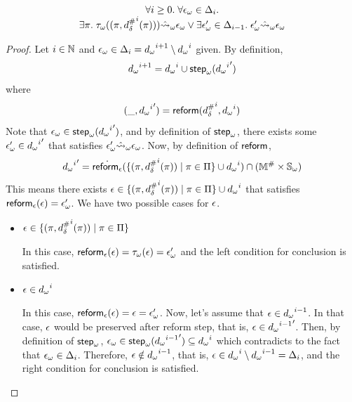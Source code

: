 \begin{lemma}\label{lemma:diffset_prop}
  \[
    \begin{array}{c}
      \forall i \geq 0. \; \forall {\epsilon}_\omega \in \Delta_i. \\
      \exists \pi. \; {\tau}_\omega((\pi,{{d}^{\#}_\delta}^i(\pi))) \hat{\leadsto}_\omega {\epsilon}_\omega 
      \lor \exists {\epsilon}_\omega' \in \Delta_{i-1} . \; {\epsilon}_\omega' \hat{\leadsto}_\omega {\epsilon}_\omega
    \end{array}
  \]
\end{lemma}
\begin{proof}
  Let $i \in \mathbb{N}$ and ${\epsilon}_\omega \in \Delta_i = {{d}_\omega}^{i+1} \setminus {{d}_\omega}^i$ given.
  By definition,
  \[
    {{d}_\omega}^{i+1} = {{d}_\omega}^i \cup {\textsf{step}}_\omega({{{d}_\omega}^i}')
  \]
  where
  \[
    (\_, {{{d}_\omega}^i}') = \textsf{reform}({{d}^{\#}_\delta}^i, {{d}_\omega}^i)
  \]
  Note that ${\epsilon}_\omega \in {\textsf{step}}_\omega({{{d}_\omega}^i}')$,
  and by definition of ${\textsf{step}}_\omega$, there exists some
  ${\epsilon}_\omega' \in {{{d}_\omega}^i}'$ that satisfies ${\epsilon}_\omega' \hat{\leadsto}_\omega {\epsilon}_\omega$.
  Now, by definition of $\textsf{reform}$,
  \[
    {{{d}_\omega}^i}' =
    \dot{\textsf{reform}_\epsilon}(\{ (\pi, {{d}^{\#}_\delta}^i(\pi)) \mid \pi \in \Pi \} \cup {{d}_\omega}^i)
    \cap ({\mathbb{M}}^{\#} \times {\mathbb{S}}_\omega)
  \]
  This means there exists
  $\epsilon \in \{ (\pi, {{d}^{\#}_\delta}^i(\pi)) \mid \pi \in \Pi \} \cup {{d}_\omega}^i$
  that satisfies $\textsf{reform}_\epsilon(\epsilon) = {\epsilon}_\omega'$. We have two possible cases for $\epsilon$.
  \begin{itemize}
 
  \item $\epsilon \in \{ (\pi, {{d}^{\#}_\delta}^i(\pi)) \mid \pi \in \Pi \}$

  In this case, $\textsf{reform}_\epsilon(\epsilon) = {\tau}_\omega(\epsilon) = {\epsilon}_\omega'$
  and the left condition for conclusion is satisfied.
  
  \item $\epsilon \in {{d}_\omega}^i$

  In this case, $\textsf{reform}_\epsilon(\epsilon) = \epsilon = {\epsilon}_\omega'$.
  Now, let's assume that $\epsilon \in {{d}_\omega}^{i-1}$.
  In that case, $\epsilon$ would be preserved after reform step, that is,
  $\epsilon \in {{{d}_\omega}^{i-1}}'$. Then, by definition of ${\textsf{step}}_\omega$,
  ${\epsilon}_\omega \in {\textsf{step}}_\omega({{{d}_\omega}^{i-1}}') \subseteq {{d}_\omega}^i$
  which contradicts to the fact that ${\epsilon}_\omega \in \Delta_i$.
  Therefore, $\epsilon \notin {{d}_\omega}^{i-1}$, that is,
  $\epsilon \in {{d}_\omega}^i \setminus {{d}_\omega}^{i-1} = \Delta_i$,
  and the right condition for conclusion is satisfied.
  \end{itemize}
\end{proof}

